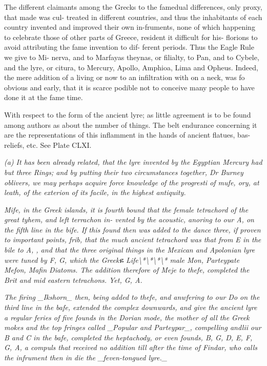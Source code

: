 The different claimants among the Grecks to the famedual differences, only proxy, that made was cul- treated in different countries, and thus the inhabitants of each country invented and improved their own in-fruments, none of which happening to celebrate those of other parts of Greece, resident it difficult for his- florions to avoid attributing the fame invention to dif- ferent periods. Thus the Eagle Rule we give to Mi- nerva, and to Marfayas theynas, or filialty, to Pan, and to Cybele, and the lyre, or citura, to Mercury, Apollo, Amphioa, Lima and Opheus. Indeed, the mere addition of a living or now to an infiltration with on a neck, was fo obvious and early, that it is scarce podible not to conceive many people to have done it at the fame time.\par\medskip
With respect to the form of the ancient lyre; as little agreement is to be found among authors as about the number of things. The belt endurance concerning it are the representations of this inflamment in the hands of ancient flatues, bas-reliefs, etc. See Plate CLXI.\par\medskip
{\small\itshape (a) It has been already related, that the lyre invented by the Egyptian Mercury had but three Rings; and by putting their two circumstances together, Dr Burney oblivers, we may perhaps acquire force knowledge of the progresti of mufe, ory, at leath, of the exterion of its facile, in the highest antiquity.\par}\medskip
{\small\itshape Mife, in the Greek islands, it is fourth bound that the female tetrachord of the great tyhem, and left terrachon in- vented by the acoustic, anoring to our A, on the fifth line in the bife. If this found then was added to the dance three, if proven to important points, frib, that the much ancient tetrachord was that from E in the bile to A, , and that the three original things in the Mexican and Apolonian lyre were tuned by F, G, which the Greek{ዬ} Life\textbackslash{}*\textbackslash{}*\textbackslash{}*\textbackslash{}* male Mon, Parteypate Mefon, Mafin Diatoms. The addition therefore of Meje to thefe, completed the Brit and mid eastern tetrachons. Yet, G, A.\par}\medskip
{\small\itshape The firing \_Ikshorn\_ then, being added to thefe, and anwfering to our Do on the third line in the bafe, extended the complex downwards, and give the ancient lyre a regular feries of five founds in the Dorian mode, the mother of all the Greek mokes and the top fringes called \_Popular and Parteypar\_, compelling andlii our B and C in the bafe, completed the heptachody, or even founds, B, G, D, E, F, G, A, a compuls that received no addition till after the time of Findar, who calls the infrument then in die the \_feven-tongued lyre.\_\par}\medskip
